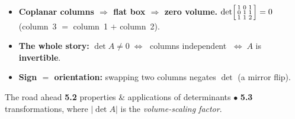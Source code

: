 \documentclass[aspectratio=169, 11pt]{beamer}
\begin{document}
\begin{frame}[t, plain]
  \begin{itemize}
    \setlength{\itemsep}{6pt}
    \item \textbf{Coplanar columns $\Rightarrow$ flat box $\Rightarrow$ zero volume.}
          $\det\begin{bsmallmatrix} 1 & 0 & 1\\ 0 & 1 & 1\\ 1 & 1 & 2 \end{bsmallmatrix}=0$
          (column~3 $=$ column~1 $+$ column~2).
    \item \textbf{The whole story:} \; $\det A\ne0 \;\Leftrightarrow\;$ columns independent
          $\;\Leftrightarrow\; A$ is \textbf{invertible}.
    \item \textbf{Sign $=$ orientation:} swapping two columns negates $\det$ (a mirror flip).
  \end{itemize}
  \vspace{2pt}
  \begin{block}{The road ahead}
    \textbf{5.2} properties \& applications of determinants \;$\bullet$\; \textbf{5.3} transformations,
    where $|\det A|$ is the \emph{volume-scaling factor}.
  \end{block}
\end{frame}
\end{document}
